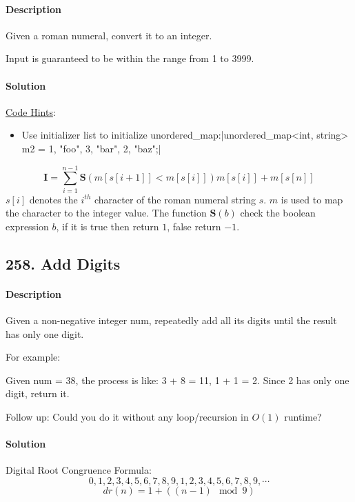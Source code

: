 \paragraph{Description}

Given a roman numeral, convert it to an integer.

Input is guaranteed to be within the range from 1 to 3999.

\paragraph{Solution}
\underline{Code Hints}:
\begin{itemize}
    \item Use initializer list to initialize unordered\_map:|unordered_map<int, string> m2 = {{1, "foo"}, {3, "bar"}, {2, "baz"}};|
\end{itemize}

$$\bm{I}=\sum^{n-1}_{i=1}{\bm{S}(m[s[i+1]]<m[s[i]])m[s[i]]}+m[s[n]]$$
$s[i]$ denotes the $i^{th}$ character of the roman numeral string $s$. $m$ is used to map the character to the integer value. The function $\bm{S}(b)$ check the boolean expression $b$, if it is true then return $1$, false return $-1$. 

\subsection{258. Add Digits}

\paragraph{Description}

Given a non-negative integer num, repeatedly add all its digits until the result has only one digit.

For example:

Given num = 38, the process is like: 3 + 8 = 11, 1 + 1 = 2. Since 2 has only one digit, return it.

Follow up:
Could you do it without any loop/recursion in $O(1)$ runtime?

\paragraph{Solution}

Digital Root Congruence Formula:
$$0, 1, 2, 3, 4, 5, 6, 7, 8, 9, 1, 2, 3, 4, 5, 6, 7, 8, 9,\cdots$$
$$dr(n)=1+((n - 1)\mod 9)$$